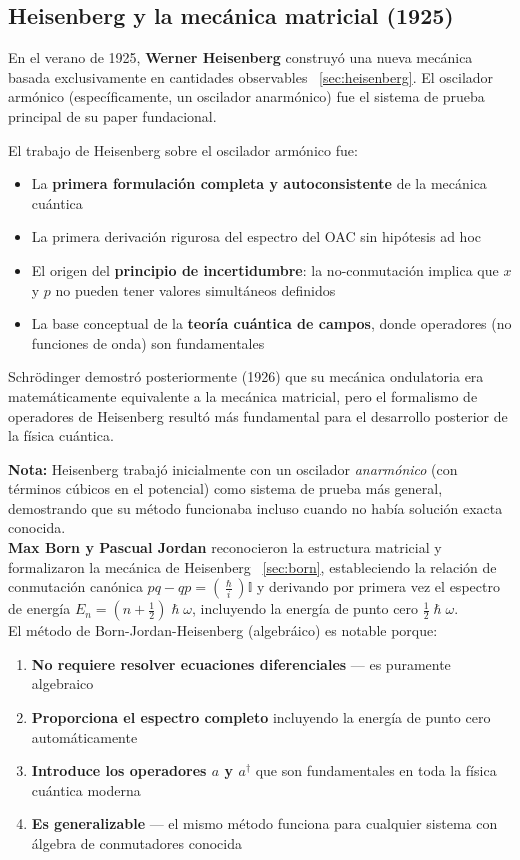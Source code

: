 \documentclass[11pt,a4paper,spanish]{book}
\begin{document}
\subsection*{Heisenberg y la mecánica matricial (1925)}
En el verano de 1925, \textbf{Werner Heisenberg} \citep{heisenberg1925} construyó una nueva mecánica basada exclusivamente en cantidades observables ~\ref{sec:heisenberg}. El oscilador armónico (específicamente, un oscilador anarmónico) fue el sistema de prueba principal de su paper fundacional.

El trabajo de Heisenberg sobre el oscilador armónico fue:

\begin{itemize}
	\item La \textbf{primera formulación completa y autoconsistente} de la mecánica cuántica
	\item La primera derivación rigurosa del espectro del OAC sin hipótesis ad hoc
	\item El origen del \textbf{principio de incertidumbre}: la no-conmutación implica que $x$ y $p$ no pueden tener valores simultáneos definidos
	\item La base conceptual de la \textbf{teoría cuántica de campos}, donde operadores (no funciones de onda) son fundamentales
\end{itemize}

Schrödinger demostró posteriormente (1926) que su mecánica ondulatoria era matemáticamente equivalente a la mecánica matricial, pero el formalismo de operadores de Heisenberg resultó más fundamental para el desarrollo posterior de la física cuántica.

\textbf{Nota:} Heisenberg trabajó inicialmente con un oscilador \emph{anarmónico} (con términos cúbicos en el potencial) como sistema de prueba más general, demostrando que su método funcionaba incluso cuando no había solución exacta conocida.\\


\textbf{Max Born y Pascual Jordan} reconocieron la estructura matricial y formalizaron la mecánica de Heisenberg ~\ref{sec:born}, estableciendo la relación de conmutación canónica $pq - qp = (\frac{\hslash}{i})\mathbb{I}$ y derivando por primera vez el espectro de energía $E_n = (n + \frac{1}{2})\hslash\omega$, incluyendo la energía de punto cero $\frac{1}{2}\hslash\omega$.\\

El método de Born-Jordan-Heisenberg (algebráico) es notable porque:

\begin{enumerate}
	\item \textbf{No requiere resolver ecuaciones diferenciales} — es puramente algebraico
	\item \textbf{Proporciona el espectro completo} incluyendo la energía de punto cero automáticamente
	\item \textbf{Introduce los operadores $a$ y $a^\dagger$} que son fundamentales en toda la física cuántica moderna
	\item \textbf{Es generalizable} — el mismo método funciona para cualquier sistema con álgebra de conmutadores conocida
\end{enumerate}
\end{document}
